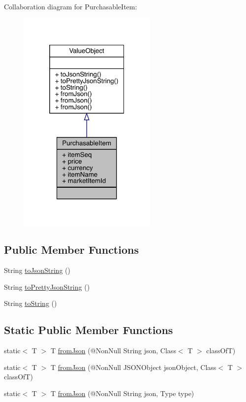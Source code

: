 Collaboration diagram for Purchasable\+Item\+:\nopagebreak
\begin{figure}[H]
\begin{center}
\leavevmode
\includegraphics[width=193pt]{classcom_1_1toast_1_1android_1_1gamebase_1_1base_1_1purchase_1_1_purchasable_item__coll__graph}
\end{center}
\end{figure}
\subsection*{Public Member Functions}
\begin{DoxyCompactItemize}
\item 
String \hyperlink{classcom_1_1toast_1_1android_1_1gamebase_1_1base_1_1_value_object_a58acf6402880e9769d79d8667581fa6a}{to\+Json\+String} ()
\item 
String \hyperlink{classcom_1_1toast_1_1android_1_1gamebase_1_1base_1_1_value_object_a054431f3d988a22295cfc8b784ff2637}{to\+Pretty\+Json\+String} ()
\item 
String \hyperlink{classcom_1_1toast_1_1android_1_1gamebase_1_1base_1_1_value_object_ad146fa8579a5f8a876c4688cc5a68520}{to\+String} ()
\end{DoxyCompactItemize}
\subsection*{Static Public Member Functions}
\begin{DoxyCompactItemize}
\item 
static$<$ T $>$ T \hyperlink{classcom_1_1toast_1_1android_1_1gamebase_1_1base_1_1_value_object_ae6655c88c20a9a8406dc11b46250ac7b}{from\+Json} (@Non\+Null String json, Class$<$ T $>$ class\+OfT)
\item 
static$<$ T $>$ T \hyperlink{classcom_1_1toast_1_1android_1_1gamebase_1_1base_1_1_value_object_ab83c4196ee2e3f11553bbe0f04dc2101}{from\+Json} (@Non\+Null J\+S\+O\+N\+Object json\+Object, Class$<$ T $>$ class\+OfT)
\item 
static$<$ T $>$ T \hyperlink{classcom_1_1toast_1_1android_1_1gamebase_1_1base_1_1_value_object_aa901d97d495150b54bcb80c05672f58a}{from\+Json} (@Non\+Null String json, Type type)
\end{DoxyCompactItemize}

